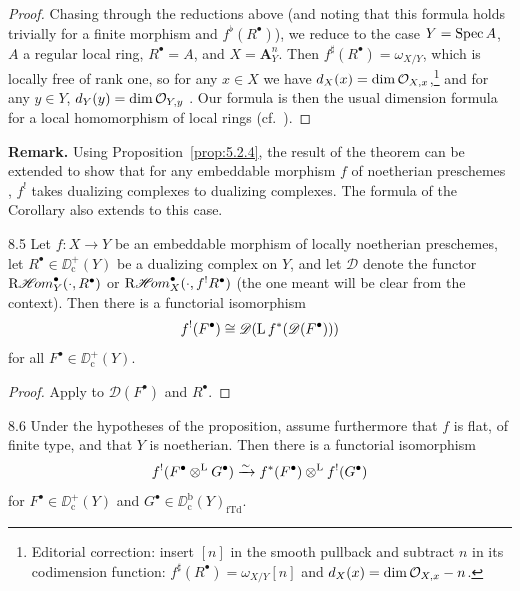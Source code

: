 \begin{proof}
Chasing through the reductions above (and noting that this formula holds trivially for a finite morphism and $f^{\flat}(R^{\bullet})$), we reduce to the case $Y=\operatorname{Spec} A$, $A$ a regular local ring, $R^\bullet=A$, and $X=\mathbf{A}_{Y}^{n}$. Then $f^{\sharp}(R^\bullet)=\omega_{X/Y}$, which is locally free of rank one, so for any $x\in X$ we have $d_X(x)=\dim\mathcal{O}_{X,x}$,\footnote{Editorial correction: insert $[n]$ in the smooth pullback and subtract $n$ in its codimension function: $f^\sharp(R^\bullet)=\omega_{X/Y}[n]$ and $d_X(x)=\dim\mathcal{O}_{X,x}-n$.} and for any $y\in Y$, $d_Y(y)=\dim\mathcal{O}_{Y,y}$ \cite[\nopp \S4]{LC}. Our formula is then the usual dimension formula for a local homomorphism of local rings (cf.\ \cite[\nopp $0_{\mathrm{IV}}$,~17.3.3]{EGA}).
\end{proof}

\par\medskip\noindent\textbf{Remark.}
Using Proposition~\ref{prop:5.2.4}, the result of the theorem can be extended to show that for any embeddable morphism $f$ of noetherian preschemes , $f^{!}$ takes dualizing complexes to dualizing complexes. The formula of the Corollary also extends to this case.
\par\medskip

\begin{bookproposition}{8.5}\label{prop:5.8.5}
Let $f\colon X\to Y$ be an embeddable morphism of locally noetherian preschemes, let $R^\bullet\in\DD^+_{\mathrm{c}}(Y)$ be a dualizing complex on $Y$, and let $\mathscr{D}$ denote the functor $\mathop{\mathrm{R}\mathscr{H}\!om}\nolimits^\bullet_{Y}(\cdot, R^\bullet)$ or $\mathop{\mathrm{R}\mathscr{H}\!om}\nolimits^\bullet_{X}(\cdot, f^{!}R^\bullet)$ (the one meant will be clear from the context). Then there is a functorial isomorphism
\[
f^{!}(F^{\bullet}) \cong \mathscr{D}(\operatorname{L} f^{*}(\mathscr{D}(F^{\bullet})))
\]
for all $F^\bullet\in\DD_{\mathrm{c}}^{+}(Y)$.
\end{bookproposition}

\begin{proof}
Apply  to $\mathscr{D}(F^\bullet)$ and $R^\bullet$.
\end{proof}

\begin{bookcorollary}{8.6}\label{cor:5.8.6}
Under the hypotheses of the proposition, assume furthermore that $f$ is flat, of finite type, and that $Y$ is noetherian. Then there is a functorial isomorphism
\[
f^{!}(F^{\bullet}\mathbin{\otimes^{\mathrm{L}}} G^{\bullet}) \xrightarrow{\sim} f^{*}(F^{\bullet}) \mathbin{\otimes^{\mathrm{L}}} f^{!}(G^{\bullet})
\]
for $F^\bullet\in\DD_{\mathrm{c}}^{+}(Y)$ and $G^\bullet\in\DD_{\mathrm{c}}^{\mathrm{b}}(Y)_{\mathrm{fTd}}$.
\end{bookcorollary}

